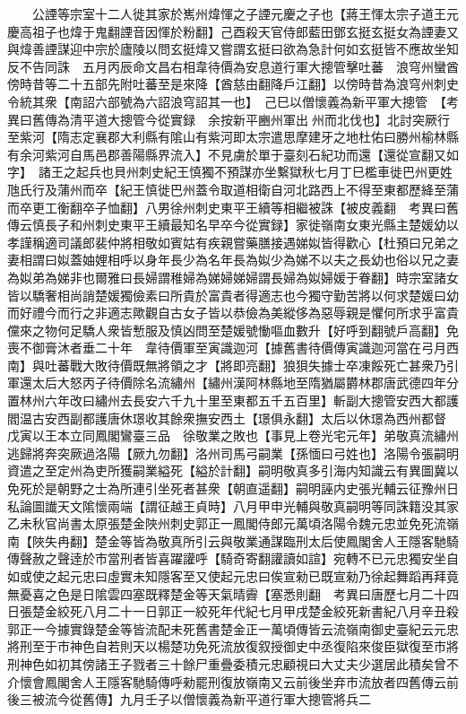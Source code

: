 　　公諲等宗室十二人徙其家於嶲州煒惲之子諲元慶之子也【蔣王惲太宗子道王元慶高祖子也煒于鬼翻諲音因惲於粉翻】己酉殺天官侍郎藍田鄧玄挺玄挺女為諲妻又與煒善諲謀迎中宗於廬陵以問玄挺煒又嘗謂玄挺曰欲為急計何如玄挺皆不應故坐知反不告同誅　五月丙辰命文昌右相韋待價為安息道行軍大摠管擊吐蕃　浪穹州蠻酋傍時昔等二十五部先附吐蕃至是來降【酋慈由翻降戶江翻】以傍時昔為浪穹州刺史令統其衆【南詔六部號為六詔浪穹詔其一也】　己巳以僧懷義為新平軍大摠管　【考異曰舊傳為清平道大摠管今從實録　余按新平豳州軍出州而北伐也】北討突厥行至紫河【隋志定襄郡大利縣有隂山有紫河即太宗遣思摩建牙之地杜佑曰勝州榆林縣有余河紫河自馬邑郡善陽縣界流入】不見虜於單于臺刻石紀功而還【還從宣翻又如字】　諸王之起兵也貝州刺史紀王慎獨不預謀亦坐繫獄秋七月丁巳檻車徙巴州更姓虺氏行及蒲州而卒【紀王慎徙巴州蓋令取道相衛自河北路西上不得至東都歷絳至蒲而卒更工衡翻卒子恤翻】八男徐州刺史東平王續等相繼被誅【被皮義翻　考異曰舊傳云慎長子和州刺史東平王續最知名早卒今從實録】家徙嶺南女東光縣主楚媛幼以孝謹稱適司議郎裴仲將相敬如賓姑有疾親嘗藥膳接遇娣姒皆得歡心【杜預曰兄弟之妻相謂曰姒蓋妯娌相呼以身年長少為名年長為姒少為娣不以夫之長幼也俗以兄之妻為姒弟為娣非也爾雅曰長婦謂稚婦為娣婦娣婦謂長婦為姒婦媛于眷翻】時宗室諸女皆以驕奢相尚誚楚媛獨儉素曰所貴於富貴者得適志也今獨守勤苦將以何求楚媛曰幼而好禮今而行之非適志歟觀自古女子皆以恭儉為美縱侈為惡辱親是懼何所求乎富貴儻來之物何足驕人衆皆慙服及慎凶問至楚媛號慟嘔血數升【好呼到翻號戶高翻】免喪不御膏沐者垂二十年　韋待價軍至寅識迦河【據舊書待價傳寅識迦河當在弓月西南】與吐蕃戰大敗待價既無將領之才【將即亮翻】狼狽失據士卒凍餒死亡甚衆乃引軍還太后大怒丙子待價除名流繡州【繡州漢阿林縣地至隋猶屬欝林郡唐武德四年分置林州六年改曰繡州去長安六千九十里至東都五千五百里】斬副大摠管安西大都護閻温古安西副都護唐休璟收其餘衆撫安西土【璟俱永翻】太后以休璟為西州都督　戊寅以王本立同鳳閣鸞臺三品　徐敬業之敗也【事見上卷光宅元年】弟敬真流繡州逃歸將奔突厥過洛陽【厥九勿翻】洛州司馬弓嗣業【孫愐曰弓姓也】洛陽令張嗣明資遣之至定州為吏所獲嗣業縊死【縊於計翻】嗣明敬真多引海内知識云有異圖冀以免死於是朝野之士為所連引坐死者甚衆【朝直遥翻】嗣明誣内史張光輔云征豫州日私論圖䜟天文隂懷兩端【謂征越王貞時】八月甲申光輔與敬真嗣明等同誅籍没其家乙未秋官尚書太原張楚金陜州刺史郭正一鳳閣侍郎元萬頃洛陽令魏元忠並免死流嶺南【陜失冉翻】楚金等皆為敬真所引云與敬業通謀臨刑太后使鳳閣舍人王隱客馳騎傳聲赦之聲逹於市當刑者皆喜躍讙呼【騎奇寄翻讙讀如諠】宛轉不已元忠獨安坐自如或使之起元忠曰虛實未知隱客至又使起元忠曰俟宣勑已既宣勑乃徐起舞蹈再拜竟無憂喜之色是日隂雲四塞既釋楚金等天氣晴霽【塞悉則翻　考異曰唐歷七月二十四日張楚金絞死八月二十一日郭正一絞死年代紀七月甲戌楚金絞死新書紀八月辛丑殺郭正一今據實錄楚金等皆流配未死舊書楚金正一萬頃傳皆云流嶺南御史臺紀云元忠將刑至于市神色自若則天以楊楚功免死流放復叙授御史中丞復陷來俊臣獄復至市將刑神色如初其傍諸王子戮者三十餘尸重疊委積元忠顧視曰大丈夫少選居此積矣曾不介懷會鳳閣舍人王隱客馳騎傳呼勑罷刑復放嶺南又云前後坐弃市流放者四舊傳云前後三被流今從舊傳】九月壬子以僧懷義為新平道行軍大摠管將兵二

